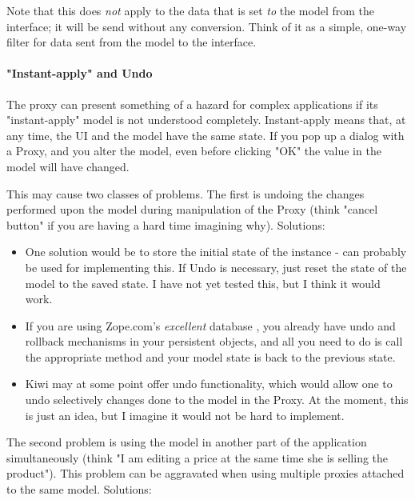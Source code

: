 \documentclass[a4paper]{howto}
\begin{document}
Note that this does {\it not} apply to the data that is set {\it to} the
model from the interface; it will be send without any conversion. Think
of it as a simple, one-way filter for data sent from the model to the
interface.

\paragraph{"Instant-apply" and Undo}
\label{undo}

The proxy can present something of a hazard for complex applications if
its "instant-apply" model is not understood completely. Instant-apply
means that, at any time, the UI and the model have the same state. If
you pop up a dialog with a Proxy, and you alter the model, even before
clicking "OK" the value in the model will have changed.

This may cause two classes of problems. The first is undoing the changes
performed upon the model during manipulation of the Proxy (think "cancel
button" if you are having a hard time imagining why). Solutions:

\begin{itemize}
\item One solution would be to store the initial state of the instance -
 can probably be used for implementing this. If Undo is
necessary, just reset the state of the model to the saved state. I have
not yet tested this, but I think it would work.

\item If you are using Zope.com's {\it excellent} database
, you already have undo and
rollback mechanisms in your persistent objects, and all you need to do
is call the appropriate method and your model state is back to the
previous state.

\item Kiwi may at some point offer undo functionality, which would allow
one to undo selectively changes done to the model in the Proxy. At the
moment, this is just an idea, but I imagine it would not be hard to
implement.
\end{itemize}

The second problem is using the model in another part of the application
simultaneously (think "I am editing a price at the same time she is
selling the product"). This problem can be aggravated when using
multiple proxies attached to the same model. Solutions:
\end{document}
